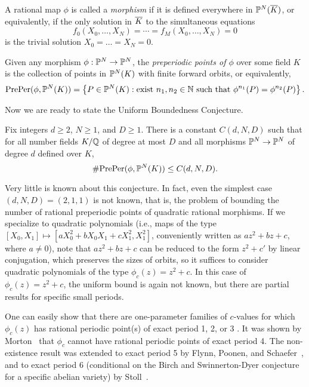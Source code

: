 \begin{definition}
  A rational map $\phi$ is called a \emph{morphism} if it is defined
  everywhere in $\P^N(\ol{K})$, or equivalently, if the only solution
  in $\ol{K}$ to the simultaneous equations
  \[
  f_0(X_0, \dots, X_N) = \cdots = f_M(X_0, \dots, X_N) = 0
  \]
  is the trivial solution $X_0 = \dots = X_N = 0$.
\end{definition}

\begin{definition}
  Given any morphism $\phi: \P^N \to \P^N$, the \emph{preperiodic
    points of $\phi$} over some field $K$ is the collection of points
  in $\P^N(K)$ with finite forward orbits, or equivalently,
  \[
  \preper(\phi, \P^N(K)) = \set{P \in \P^N(K) : \text{exist $n_1, n_2
      \in \N$ such that $\phi^{n_1}(P) = \phi^{n_2}(P)$}}.
  \]
\end{definition}

Now we are ready to state the Uniform Boundedness Conjecture.

\begin{conjecture}
  Fix integers $d \ge 2$, $N \ge 1$, and $D \ge 1$. There is a
  constant $C(d, N, D)$ such that for all number fields $K/\Q$ of
  degree at most $D$ and all morphisms $\P^N \to \P^N$ of degree $d$
  defined over $K$,
  \[
  \#\preper(\phi, \P^N(K)) \le C(d, N, D).
  \]
\end{conjecture}

Very little is known about this conjecture. In fact, even the simplest
case $(d, N, D) = (2, 1, 1)$ is not known, that is, the problem of
bounding the number of rational preperiodic points of quadratic
rational morphisms. If we specialize to quadratic polynomials (i.e.,
maps of the type $[X_0, X_1] \mapsto [a X_0^2 + b X_0 X_1 + c X_1^2,
X_1^2]$, conveniently written as $a z^2 + b z + c$, where $a \ne 0$),
note that $a z^2 + b z + c$ can be reduced to the form $z^2 + c'$ by
linear conjugation, which preserves the sizes of orbits, so it
suffices to consider quadratic polynomials of the type $\phi_c(z) =
z^2 + c$. In this case of $\phi_c(z) = z^2 + c$, the uniform bound is
again not known, but there are partial results for specific small
periods.

One can easily show that there are one-parameter families of
$c$-values for which $\phi_c(z)$ has rational periodic point(s) of
exact period 1, 2, or 3 \cite{MR1199627}. It was shown by
Morton~\cite{MR1665198} that $\phi_c$ cannot have rational periodic
points of exact period 4. The non-existence result was extended to
exact period 5 by Flynn, Poonen, and Schaefer~\cite{MR1480542}, and to
exact period 6 (conditional on the Birch and Swinnerton-Dyer
conjecture for a specific abelian variety) by Stoll~\cite{MR2465796}.

